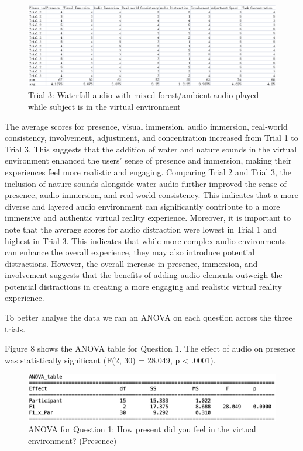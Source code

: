 \documentclass[manuscript,screen,review]{acmart}
\begin{document}
\begin{figure}[ht]
  \centering
  \includegraphics[width=\linewidth]{trial2.png}
  \caption{Trial 3: Waterfall audio with mixed forest/ambient audio played while subject is in the virtual environment}
\end{figure}





The average scores for presence, visual immersion, audio immersion, real-world consistency, involvement, adjustment, and concentration increased from Trial 1 to Trial 3. This suggests that the addition of water and nature sounds in the virtual environment enhanced the users' sense of presence and immersion, making their experiences feel more realistic and engaging.
Comparing Trial 2 and Trial 3, the inclusion of nature sounds alongside water audio further improved the sense of presence, audio immersion, and real-world consistency. This indicates that a more diverse and layered audio environment can significantly contribute to a more immersive and authentic virtual reality experience.
Moreover, it is important to note that the average scores for audio distraction were lowest in Trial 1 and highest in Trial 3. This indicates that while more complex audio environments can enhance the overall experience, they may also introduce potential distractions. However, the overall increase in presence, immersion, and involvement suggests that the benefits of adding audio elements outweigh the potential distractions in creating a more engaging and realistic virtual reality experience.

To better analyse the data we ran an ANOVA on each question across the three trials. 

Figure 8 shows the ANOVA table for Question 1. The effect of audio on presence was statistically significant (F(2, 30) = 28.049, p < .0001).


\begin{figure}[ht]
  \centering
  \includegraphics[width=\linewidth]{Q1ANOVA.png}
  \caption{ANOVA for Question 1:  How present did you feel in the virtual environment? (Presence)}
\end{figure}
\end{document}
